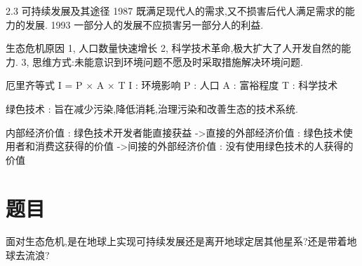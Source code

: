 \documentclass[a4paper]{book}
\numberwithin{equation}{chapter}
\theoremstyle{definition}
\begin{document}
	
	
	2.3 可持续发展及其途径
	1987    既满足现代人的需求,又不损害后代人满足需求的能力的发展.
	1993    一部分人的发展不应损害另一部分人的利益.
	
	
	生态危机原因
	1, 人口数量快速增长
	2, 科学技术革命,极大扩大了人开发自然的能力.
	3, 思维方式:未能意识到环境问题不愿及时采取措施解决环境问题.
	
	厄里齐等式
	I = P × A × T
	I : 环境影响
	P : 人口
	A : 富裕程度
	T : 科学技术
	
	
	绿色技术 : 旨在减少污染,降低消耗,治理污染和改善生态的技术系统.
	
	内部经济价值 : 绿色技术开发者能直接获益
	->直接的外部经济价值 : 绿色技术使用者和消费这获得的价值
	->间接的外部经济价值 : 没有使用绿色技术的人获得的价值
	
	
	\section{题目}
	\heiti\large 面对生态危机,是在地球上实现可持续发展还是离开地球定居其他星系?还是带着地球去流浪?
\end{document}
